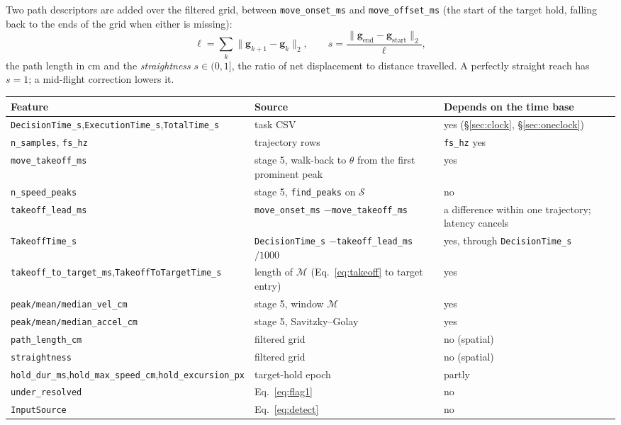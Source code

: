 \documentclass[11pt,a4paper]{article}
\newcommand{\code}[1]{\texttt{\small #1}}
\begin{document}
Two path descriptors are added over the filtered grid, between
\code{move\_onset\_ms} and \code{move\_offset\_ms} (the start of the target
hold, falling back to the ends of the grid when either is missing):
\begin{equation}
  \ell = \sum_k \big\| \bm{g}_{k+1} - \bm{g}_k \big\|_2,
  \qquad
  s = \frac{\|\bm{g}_{\text{end}} - \bm{g}_{\text{start}}\|_2}{\ell},
  \label{eq:path}
\end{equation}
the path length in cm and the \emph{straightness} $s \in (0, 1]$, the ratio of
net displacement to distance travelled. A perfectly straight reach has $s = 1$;
a mid-flight correction lowers it.

\begin{center}
\small
\begin{tabular}{@{}P{5.4cm}P{4.6cm}P{5.1cm}@{}}
\toprule
Feature & Source & Depends on the time base \\
\midrule
\code{DecisionTime\_s},\newline\code{ExecutionTime\_s},\newline\code{TotalTime\_s} & task CSV &
  yes (\S\ref{sec:clock}, \S\ref{sec:oneclock}) \\
\code{n\_samples}, \code{fs\_hz} & trajectory rows & \code{fs\_hz} yes \\
\code{move\_takeoff\_ms} & stage 5, walk-back to $\theta$ from the first
  prominent peak & yes \\
\code{n\_speed\_peaks} & stage 5, \code{find\_peaks} on $\mathcal{S}$ & no \\
\code{takeoff\_lead\_ms} & \code{move\_onset\_ms} $-$\newline\code{move\_takeoff\_ms} &
  a difference within one trajectory; latency cancels \\
\code{TakeoffTime\_s} & \code{DecisionTime\_s} $-$\newline\code{takeoff\_lead\_ms}$/1000$ &
  yes, through \code{DecisionTime\_s} \\
\code{takeoff\_to\_target\_ms},\newline\code{TakeoffToTargetTime\_s} &
  length of $\mathcal{M}$ (Eq.~\eqref{eq:takeoff} to target entry) & yes \\
\code{peak/mean/median\_vel\_cm} & stage 5, window $\mathcal{M}$ & yes \\
\code{peak/mean/median\_\-accel\_cm} & stage 5, Savitzky--Golay & yes \\
\code{path\_length\_cm} & filtered grid & no (spatial) \\
\code{straightness} & filtered grid & no (spatial) \\
\code{hold\_dur\_ms},\newline\code{hold\_max\_speed\_cm},\newline\code{hold\_excursion\_px} &
  target-hold epoch & partly \\
\code{under\_resolved} & Eq.~\eqref{eq:flag1} & no \\
\code{InputSource} & Eq.~\eqref{eq:detect} & no \\
\bottomrule
\end{tabular}
\end{center}
\end{document}
